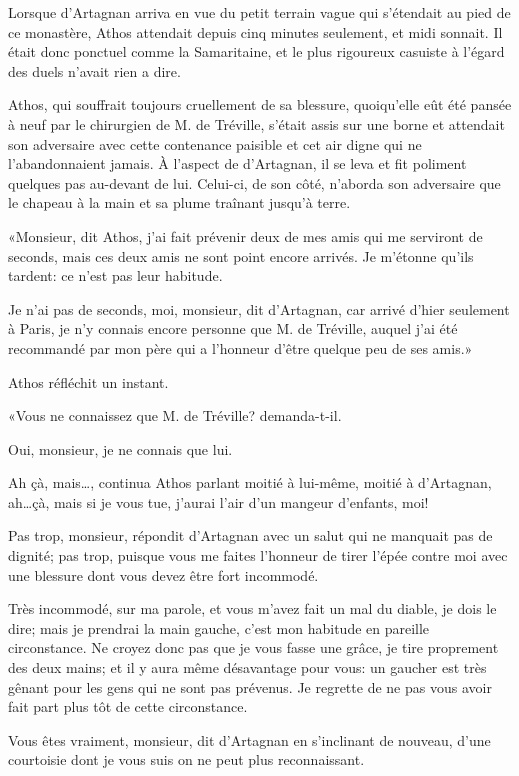 Lorsque d'Artagnan arriva en vue du petit terrain vague qui s'étendait au pied de ce monastère, Athos attendait depuis cinq minutes seulement, et midi sonnait. Il était donc ponctuel comme la Samaritaine, et le plus rigoureux casuiste à l'égard des duels n'avait rien a dire. 

Athos, qui souffrait toujours cruellement de sa blessure, quoiqu'elle eût été pansée à neuf par le chirurgien de M. de Tréville, s'était assis sur une borne et attendait son adversaire avec cette contenance paisible et cet air digne qui ne l'abandonnaient jamais. À l'aspect de d'Artagnan, il se leva et fit poliment quelques pas au-devant de lui. Celui-ci, de son côté, n'aborda son adversaire que le chapeau à la main et sa plume traînant jusqu'à terre. 

«Monsieur, dit Athos, j'ai fait prévenir deux de mes amis qui me serviront de seconds, mais ces deux amis ne sont point encore arrivés. Je m'étonne qu'ils tardent: ce n'est pas leur habitude. 

\speak  Je n'ai pas de seconds, moi, monsieur, dit d'Artagnan, car arrivé d'hier seulement à Paris, je n'y connais encore personne que M. de Tréville, auquel j'ai été recommandé par mon père qui a l'honneur d'être quelque peu de ses amis.» 

Athos réfléchit un instant. 

«Vous ne connaissez que M. de Tréville? demanda-t-il. 

\speak  Oui, monsieur, je ne connais que lui. 

\speak  Ah çà, mais\dots, continua Athos parlant moitié à lui-même, moitié à d'Artagnan, ah\dots çà, mais si je vous tue, j'aurai l'air d'un mangeur d'enfants, moi! 

\speak  Pas trop, monsieur, répondit d'Artagnan avec un salut qui ne manquait pas de dignité; pas trop, puisque vous me faites l'honneur de tirer l'épée contre moi avec une blessure dont vous devez être fort incommodé. 

\speak  Très incommodé, sur ma parole, et vous m'avez fait un mal du diable, je dois le dire; mais je prendrai la main gauche, c'est mon habitude en pareille circonstance. Ne croyez donc pas que je vous fasse une grâce, je tire proprement des deux mains; et il y aura même désavantage pour vous: un gaucher est très gênant pour les gens qui ne sont pas prévenus. Je regrette de ne pas vous avoir fait part plus tôt de cette circonstance. 

\speak  Vous êtes vraiment, monsieur, dit d'Artagnan en s'inclinant de nouveau, d'une courtoisie dont je vous suis on ne peut plus reconnaissant. 

